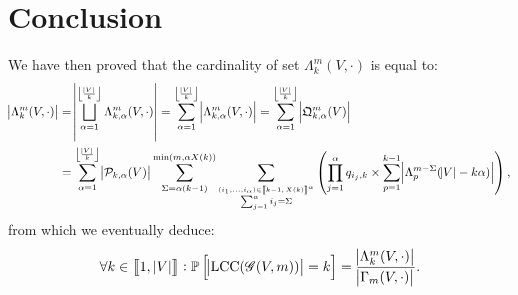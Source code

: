 \documentclass{article}
\theoremstyle{definition}
\theoremstyle{remark}
\DeclareMathOperator{\LCC}{LCC}
\renewcommand{\P}{\mathbb P}
\newcommand{\intint}[2]{\left\llbracket#1, \, #2\right\rrbracket}
\newcommand{\floor}[1]{\left\lfloor#1\right\rfloor}
\begin{document}
\section{Conclusion}
	We have then proved that the cardinality of set $\Lambda_k^m(V, \cdot)$ is equal to:
	\begin{align*}
		\abs {\Lambda_k^m(V, \cdot)} &= \abs {\bigsqcup_{\alpha=1}^{\floor {\frac {\abs V}k}}\Lambda_{k,\alpha}^m(V, \cdot)}
			= \sum_{\alpha=1}^{\floor {\frac {\abs V}k}}\abs {\Lambda_{k,\alpha}^m(V, \cdot)} = \sum_{\alpha=1}^{\floor {\frac {\abs V}k}}\abs {\mathfrak Q_{k,\alpha}^m(V)} \\
		&= \sum_{\alpha=1}^{\floor {\frac {\abs V}k}}\abs {\mathcal P_{k,\alpha}(V)}\sum_{\Sigma=\alpha(k-1)}^{\min(m, \alpha X(k))}
			\sum_{\stackrel {(i_1, \ldots, i_\alpha) \in \intint {k-1}{X(k)}^\alpha}{\sum_{j=1}^\alpha i_j = \Sigma}}
			\left(\prod_{j=1}^\alpha q_{i_j,k} \times \sum_{p=1}^{k-1}\abs {\Lambda_p^{m-\Sigma}(\abs V-k\alpha)}\right),
	\end{align*}
	from which we eventually deduce:
	\[\forall k \in \intint 1{\abs V} : \P\left[\abs {\LCC(\mathscr G(V, m))} = k\right] = \frac {\abs {\Lambda_k^m(V, \cdot)}}{\abs {\Gamma_m(V, \cdot)}}.\]

{}

\end{document}
